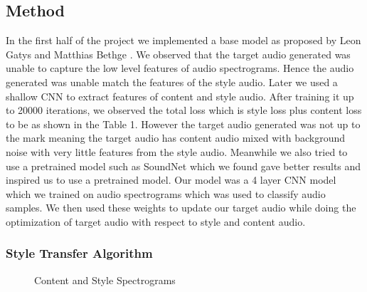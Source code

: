 \documentclass[10pt,twocolumn,letterpaper]{article}
\begin{document}
\subsection{Method}
In the first half of the project we implemented a base model as proposed by Leon Gatys and Matthias Bethge \cite{Authors00001}. We observed that the target audio generated was unable to capture the low level features of audio spectrograms. Hence the audio generated was unable match the features of the style audio. 
Later we used a shallow CNN to extract features of content and style audio. After training it up to 20000 iterations, we observed the total loss which is style loss plus content loss to be as shown in the Table 1. However the target audio generated was not up to the mark meaning the target audio has content audio mixed with background noise with very little features from the style audio. Meanwhile we also tried to use a pretrained model such as SoundNet which we found gave better results and inspired us to use a pretrained model. Our model was a 4 layer CNN model which we trained on audio spectrograms which was used to classify audio samples. We then used these weights to update our target audio while doing the optimization of target audio with respect to style and content audio.





\subsubsection{Style Transfer Algorithm}

\begin{figure}
\begin{center}
\end{center}
   \caption{Content and Style Spectrograms}
\label{fig:short}
\end{figure}
\end{document}
